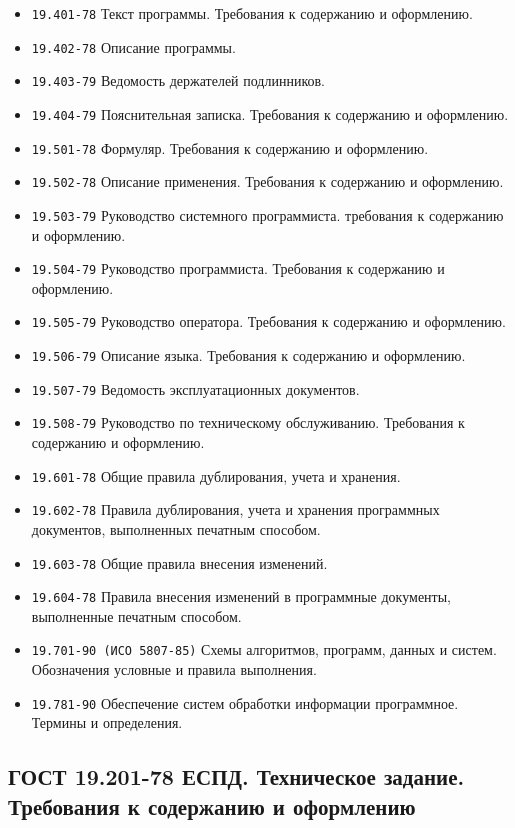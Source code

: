 \documentclass[a4paper, 14pt]{article}
\begin{document}
\begin{itemize}
    \item \texttt{19.401-78} Текст программы. Требования к содержанию и оформлению.
    \item \texttt{19.402-78} Описание программы.
    \item \texttt{19.403-79} Ведомость держателей подлинников.
    \item \texttt{19.404-79} Пояснительная записка. Требования к содержанию и оформлению.
    \item \texttt{19.501-78} Формуляр. Требования к содержанию и оформлению.
    \item \texttt{19.502-78} Описание применения. Требования к содержанию и оформлению.
    \item \texttt{19.503-79} Руководство системного программиста. требования к содержанию и оформлению.
    \item \texttt{19.504-79} Руководство программиста. Требования к содержанию и оформлению.
    \item \texttt{19.505-79} Руководство оператора. Требования к содержанию и оформлению.
    \item \texttt{19.506-79} Описание языка. Требования к содержанию и оформлению.
    \item \texttt{19.507-79} Ведомость эксплуатационных документов.
    \item \texttt{19.508-79} Руководство по техническому обслуживанию. Требования к содержанию и оформлению.
    \item \texttt{19.601-78} Общие правила дублирования, учета и хранения.
    \item \texttt{19.602-78} Правила дублирования, учета и хранения программных документов, выполненных печатным способом.
    \item \texttt{19.603-78} Общие правила внесения изменений.
    \item \texttt{19.604-78} Правила внесения изменений в программные документы, выполненные печатным способом.
    \item \texttt{19.701-90 (ИСО 5807-85)} Схемы алгоритмов, программ, данных и систем. Обозначения условные и правила выполнения.
    \item \texttt{19.781-90} Обеспечение систем обработки информации программное. Термины и определения.
\end{itemize}

\subsection{ГОСТ 19.201-78 ЕСПД. Техническое задание. Требования к содержанию и оформлению}
\end{document}

